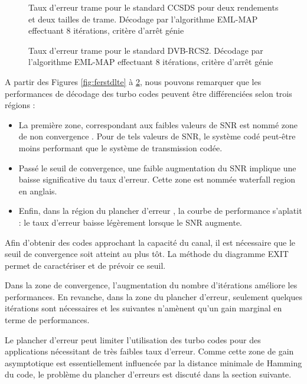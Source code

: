 \begin{figure}[h]
\centering
				
		\caption{Taux d'erreur trame pour le standard CCSDS pour deux rendements et deux tailles de trame. Décodage par l'algorithme EML-MAP effectuant 8 itérations, critère d’arrêt génie}
		\label{fig:ferstdCCSDS}
\end{figure}

\begin{figure}[h]
\centering
				
		\caption{Taux d'erreur trame pour le standard DVB-RCS2. Décodage par l'algorithme EML-MAP effectuant 8 itérations, critère d’arrêt génie}
		\label{fig:ferstdDVB2}
\end{figure}

\clearpage
A partir des Figures \ref{fig:ferstdlte} à \ref{fig:ferstdDVB2}, nous pouvons remarquer que les performances de décodage des turbo codes peuvent être différenciées selon trois régions :
\begin{itemize}
	\item La première zone, correspondant aux faibles valeurs de SNR est nommé \og zone de non convergence \fg. Pour de tels valeurs de SNR, le système codé peut-être moins performant que le système de transmission codée.
	\item Passé le seuil de convergence, une faible augmentation du SNR implique une baisse significative du taux d'erreur. Cette zone est nommée \og waterfall region \fg  en anglais.
	\item Enfin, dans la région du \og plancher d'erreur \fg, la courbe de performance s’aplatit : le taux d'erreur baisse légèrement lorsque le SNR augmente.
\end{itemize}

Afin d'obtenir des codes approchant la capacité du canal, il est nécessaire que le seuil de convergence soit atteint au plus tôt. La méthode du diagramme EXIT \cite{exitchart} permet de caractériser et de prévoir ce seuil. 

Dans la zone de convergence, l'augmentation du nombre d'itérations améliore les performances. En revanche, dans la zone du plancher d'erreur, seulement quelques itérations sont nécessaires et les suivantes n'amènent qu'un gain marginal en terme de performances.

Le plancher d'erreur peut limiter l'utilisation des turbo codes pour des applications nécessitant de très faibles taux d'erreur. Comme cette zone de gain asymptotique est essentiellement influencée par la distance minimale de Hamming du code, le problème du plancher d'erreurs est discuté dans la section suivante.

